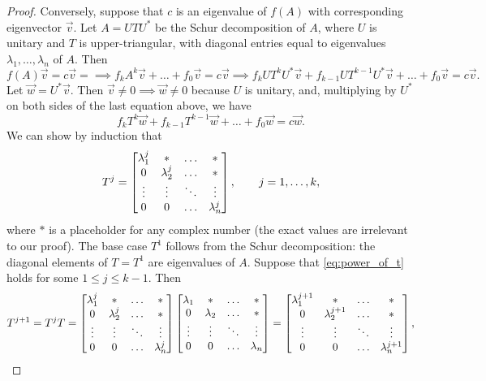\documentclass{homework}
\begin{document}
\begin{proof}
		Conversely, suppose that $c$ is an eigenvalue of $f(A)$ with corresponding eigenvector $\vec{v}$. Let $A = UTU^*$ be the Schur decomposition of $A$, where $U$ is unitary and $T$ is upper-triangular, with diagonal entries equal to eigenvalues $\lambda_1, \dots, \lambda_n$ of $A$. Then
		\begin{equation*}
			f(A)\vec{v} = c\vec{v} = \implies f_kA^k\vec{v} + \dots + f_0\vec{v} = c\vec{v} \implies f_kUT^kU^*\vec{v} + f_{k-1}UT^{k-1}U^*\vec{v} + \dots + f_0 \vec{v} = c\vec{v}.
		\end{equation*}
		Let $\vec{w} = U^*\vec{v}$. Then $\vec{v} \ne0 \implies \vec{w} \ne 0$ because $U$ is unitary, and, multiplying by $U^*$ on both sides of the last equation above, we have
		\begin{equation*}
			f_kT^k\vec{w} + f_{k-1}T^{k-1}\vec{w} + \dots + f_0\vec{w} = c\vec{w}.
		\end{equation*}
		We can show by induction that
		\begin{equation}
			\label{eq:power_of_t}
			T^j = \left[\begin{matrix}\lambda_1^j & * & \hdots & * \\ 0 & \lambda_2^j & \hdots & * \\ \vdots & \vdots & \ddots & \vdots \\ 0 & 0 & \hdots & \lambda_n^j\end{matrix}\right],\qquad j=1,\dots, k,
		\end{equation}
		where $*$ is a placeholder for any complex number (the exact values are irrelevant to our proof). The base case $T^1$ follows from the Schur decomposition: the diagonal elements of $T = T^1$ are eigenvalues of $A$. Suppose that \eqref{eq:power_of_t} holds for some $1 \le j \le k-1$. Then
		\begin{equation*}
			T^{j+1} = T^j T = \left[\begin{matrix}\lambda_1^j & * & \hdots & * \\ 0 & \lambda_2^j & \hdots & * \\ \vdots & \vdots & \ddots & \vdots \\ 0 & 0 & \hdots & \lambda_n^j\end{matrix}\right]\left[\begin{matrix}\lambda_1 & * & \hdots & * \\ 0 & \lambda_2 & \hdots & * \\ \vdots & \vdots & \ddots & \vdots \\ 0 & 0 & \hdots & \lambda_n\end{matrix}\right] =\left[\begin{matrix}\lambda_1^{j+1} & * & \hdots & * \\ 0 & \lambda_2^{j+1} & \hdots & * \\ \vdots & \vdots & \ddots & \vdots \\ 0 & 0 & \hdots & \lambda_n^{j+1}\end{matrix}\right],
		\end{equation*}

\end{proof}
\end{document}
